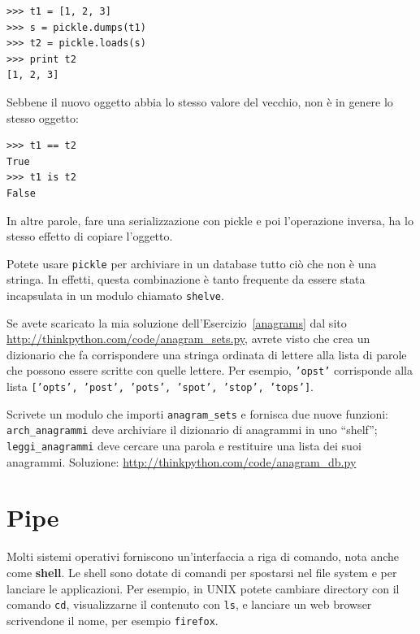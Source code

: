 \documentclass[10pt]{book}
\begin{document}
\begin{verbatim}
>>> t1 = [1, 2, 3]
>>> s = pickle.dumps(t1)
>>> t2 = pickle.loads(s)
>>> print t2
[1, 2, 3]
\end{verbatim}
%
Sebbene il nuovo oggetto abbia lo stesso valore del vecchio, non è in genere lo stesso oggetto:

\begin{verbatim}
>>> t1 == t2
True
>>> t1 is t2
False
\end{verbatim}
%
In altre parole, fare una serializzazione con pickle e poi l'operazione inversa, ha lo stesso effetto di copiare l'oggetto.

Potete usare {\tt pickle} per archiviare in un database tutto ciò che non è una stringa. In effetti, questa combinazione è tanto frequente da essere stata incapsulata in un modulo chiamato {\tt shelve}.  

\vspace{0.2in}
\begin{exercise}

Se avete scaricato la mia soluzione dell'Esercizio~\ref{anagrams} dal sito
\url{http://thinkpython.com/code/anagram_sets.py}, avrete visto che crea un dizionario che fa corrispondere una stringa ordinata di lettere alla lista di parole che possono essere scritte con quelle lettere. Per esempio, {\tt   'opst'} corrisponde alla lista {\tt ['opts', 'post', 'pots', 'spot', 'stop', 'tops']}.

Scrivete un modulo che importi \verb"anagram_sets" e fornisca due nuove funzioni: \verb"arch_anagrammi" deve archiviare il dizionario di anagrammi in uno ``shelf''; \verb"leggi_anagrammi" deve cercare una parola e restituire una lista dei suoi anagrammi. Soluzione: \url{http://thinkpython.com/code/anagram_db.py}

\end{exercise}


\section{Pipe}

Molti sistemi operativi forniscono un'interfaccia a riga di comando, nota anche come {\bf shell}.  Le shell sono dotate di comandi per spostarsi nel file system e per lanciare le applicazioni. Per esempio, in UNIX potete cambiare directory con il comando {\tt cd},
visualizzarne il contenuto con {\tt ls}, e lanciare un web browser scrivendone il nome, per esempio {\tt firefox}.
\end{document}
